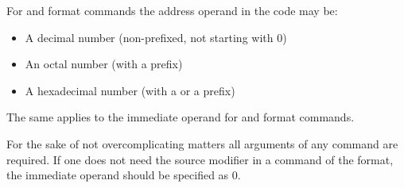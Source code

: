 For  and  format commands the address operand in the code may be:

\begin{itemize}
    \item A decimal number (non-prefixed, not starting with 0)
    \item An octal number (with a  prefix)
    \item A hexadecimal number (with a  or a  prefix)
\end{itemize}

The same applies to the immediate operand for  and  format commands.

For the sake of not overcomplicating matters all arguments of any command are required.
If one does not need the source modifier in a command of the  format, the immediate operand should be specified as 0.